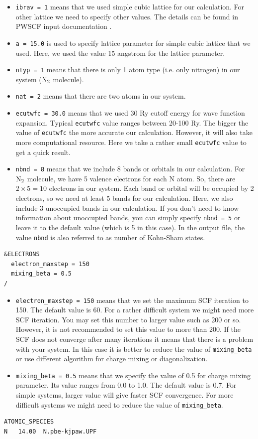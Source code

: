 \documentclass[12pt,english]{paper}
\begin{document}
\begin{itemize}
\item \texttt{ibrav = 1} means that we used simple cubic lattice for our
calculation. For other lattice we need to specify other values. The
details can be found in PWSCF input documentation \cite{pwscf-doc}.
\item \texttt{a = 15.0} is used to specify lattice parameter for simple
cubic lattice that we used. Here, we used the value 15 angstrom for
the lattice parameter.
\item \texttt{ntyp = 1} means that there is only 1 atom type (i.e. only
nitrogen) in our system ($\ce{N2}$ molecule).
\item \texttt{nat = 2} means that there are two atoms in our system.
\item \texttt{ecutwfc = 30.0} means that we used 30 Ry cutoff energy for
wave function expansion. Typical \texttt{ecutwfc} value ranges between
20-100 Ry. The bigger the value of \texttt{ecutwfc} the more accurate
our calculation. However, it will also take more computational resource.
Here we take a rather small \texttt{ecutwfc} value to get a quick
result.
\item \texttt{nbnd = 8} means that we include 8 bands or orbitals in our
calculation. For $\ce{N2}$ molecule, we have 5 valence electrons
for each N atom. So, there are $2\times5=10$ electrons in our system.
Each band or orbital will be occupied by 2 electrons, so we need at
least 5 bands for our calculation. Here, we also include 3 unoccupied
bands in our calculation. If you don't need to know information about
unoccupied bands, you can simply specify \texttt{nbnd = 5} or leave
it to the default value (which is 5 in this case). In the output file,
the value \texttt{nbnd} is also referred to as number of Kohn-Sham
states.
\end{itemize}
\begin{lstlisting}
&ELECTRONS
  electron_maxstep = 150
  mixing_beta = 0.5
/
\end{lstlisting}

\begin{itemize}
\item \texttt{electron\_maxstep = 150} means that we set the maximum SCF
iteration to 150. The default value is 60. For a rather difficult
system we might need more SCF iteration. You may set this number to
larger value such as 200 or so. However, it is not recommended to
set this value to more than 200. If the SCF does not converge after
many iterations it means that there is a problem with your system.
In this case it is better to reduce the value of \texttt{mixing\_beta}
or use different algorithm for charge mixing or diagonalization.
\item \texttt{mixing\_beta = 0.5} means that we specify the value of 0.5
for charge mixing parameter. Its value ranges from 0.0 to 1.0. The
default value is 0.7. For simple systems, larger value will give faster
SCF convergence. For more difficult systems we might need to reduce
the value of \texttt{mixing\_beta}.
\end{itemize}
\begin{lstlisting}
ATOMIC_SPECIES
N   14.00  N.pbe-kjpaw.UPF
\end{lstlisting}
\end{document}
